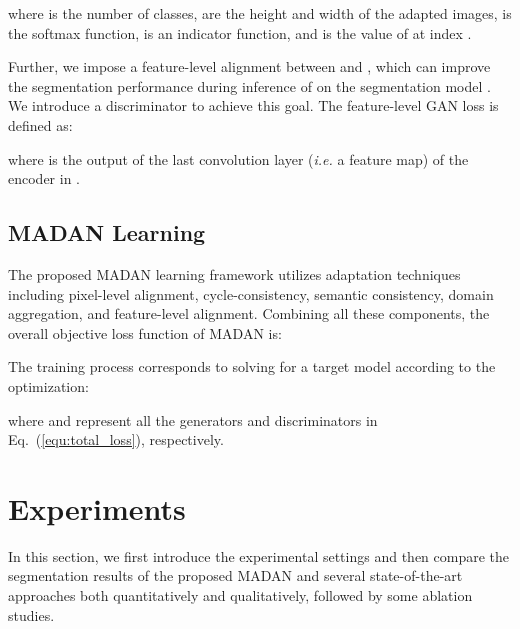 \documentclass{article}
\begin{document}
where  is the number of classes,  are the height and width of the adapted images,  is the softmax function,   is an indicator function, and  is the value of  at index .

Further, we impose a feature-level alignment between  and , which can improve the segmentation performance during inference of  on the segmentation model . We introduce a discriminator  to achieve this goal. The feature-level GAN loss is defined as:

where  is the output of the last convolution layer (\textit{i.e.} a feature map) of the encoder in .


\subsection{MADAN Learning}
The proposed MADAN learning framework utilizes adaptation techniques including pixel-level alignment, cycle-consistency, semantic consistency, domain aggregation, and feature-level alignment. Combining all these components, the overall objective loss function of MADAN is:

The training process corresponds to solving for a target model  according to the optimization:

where  and  represent all the generators and discriminators in Eq.~(\ref{equ:total_loss}), respectively.












\section{Experiments}
In this section, we first introduce the experimental settings and then compare the segmentation results of the proposed MADAN and several state-of-the-art approaches both quantitatively and qualitatively, followed by some ablation studies.
\end{document}

